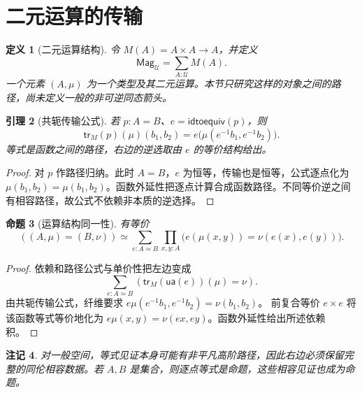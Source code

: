 \documentclass[12pt,oneside,openany,fontset=none]{ctexbook}
\theoremstyle{cn}
\newtheorem{definition}{定义}[chapter]
\newtheorem{lemma}[definition]{引理}
\newtheorem{proposition}[definition]{命题}
\newtheorem{remark}[definition]{注记}
\numberwithin{equation}{chapter}
\newcommand{\U}{\mathcal U}
\newcommand{\tr}{\mathsf{tr}}
\newcommand{\ua}{\mathsf{ua}}
\newcommand{\idtoequiv}{\mathsf{idtoequiv}}
\begin{document}
\section{二元运算的传输}
\begin{definition}[二元运算结构]
令 $M(A)=A\times A\to A$，并定义
\[
\mathsf{Mag}_{\U}=\sum_{A:\U}M(A).
\]
一个元素 $(A,\mu)$ 为一个类型及其二元运算。本节只研究这样的对象之间的路径，尚未定义一般的非可逆同态箭头。
\end{definition}
\begin{lemma}[共轭传输公式]
若 $p:A=B$、$e=\idtoequiv(p)$，则
\[
\tr_M(p)(\mu)(b_1,b_2)
=e\bigl(\mu(e^{-1}b_1,e^{-1}b_2)\bigr).
\]
等式是函数之间的路径，右边的逆选取由 $e$ 的等价结构给出。
\end{lemma}
\begin{proof}
对 $p$ 作路径归纳。此时 $A=B$，$e$ 为恒等，传输也是恒等，公式逐点化为 $\mu(b_1,b_2)=\mu(b_1,b_2)$。函数外延性把逐点计算合成函数路径。不同等价逆之间有相容路径，故公式不依赖非本质的逆选择。
\end{proof}
\begin{proposition}[运算结构同一性]
有等价
\[
((A,\mu)=(B,\nu))
\simeq
\sum_{e:A\simeq B}\prod_{x,y:A}
\bigl(e(\mu(x,y))=\nu(e(x),e(y))\bigr).
\]
\end{proposition}
\begin{proof}
依赖和路径公式与单价性把左边变成
\[
\sum_{e:A\simeq B}(\tr_M(\ua(e))(\mu)=\nu).
\]
由共轭传输公式，纤维要求
$e\mu(e^{-1}b_1,e^{-1}b_2)=\nu(b_1,b_2)$。
前复合等价 $e\times e$ 将该函数等式等价地化为
$e\mu(x,y)=\nu(ex,ey)$。函数外延性给出所述依赖积。
\end{proof}
\begin{remark}
对一般空间，等式见证本身可能有非平凡高阶路径，因此右边必须保留完整的同伦相容数据。若 $A,B$ 是集合，则逐点等式是命题，这些相容见证也成为命题。
\end{remark}
\end{document}
